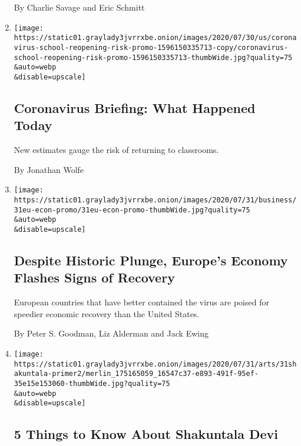\begin{enumerate}
  By Charlie Savage and Eric Schmitt
\item
  \href{/2020/07/31/us/coronavirus-today.html}{}

  \texttt{[image: https://static01.graylady3jvrrxbe.onion/images/2020/07/30/us/coronavirus-school-reopening-risk-promo-1596150335713-copy/coronavirus-school-reopening-risk-promo-1596150335713-thumbWide.jpg?quality=75\\\&auto=webp\\\&disable=upscale]}

  \hypertarget{coronavirus-briefing-what-happened-today}{%
  \subsection{Coronavirus Briefing: What Happened
  Today}\label{coronavirus-briefing-what-happened-today}}

  New estimates gauge the risk of returning to classrooms.

  By Jonathan Wolfe
\item
  \href{/2020/07/31/business/europe-economy-recovery-coronavirus.html}{}

  \texttt{[image: https://static01.graylady3jvrrxbe.onion/images/2020/07/31/business/31eu-econ-promo/31eu-econ-promo-thumbWide.jpg?quality=75\\\&auto=webp\\\&disable=upscale]}

  \hypertarget{despite-historic-plunge-europes-economy-flashes-signs-of-recovery}{%
  \subsection{Despite Historic Plunge, Europe's Economy Flashes Signs of
  Recovery}\label{despite-historic-plunge-europes-economy-flashes-signs-of-recovery}}

  European countries that have better contained the virus are poised for
  speedier economic recovery than the United States.

  By Peter S. Goodman, Liz Alderman and Jack Ewing
\item
  \href{/2020/07/31/movies/shakuntala-devi-movie.html}{}

  \texttt{[image: https://static01.graylady3jvrrxbe.onion/images/2020/07/31/arts/31shakuntala-primer2/merlin\_175165059\_16547c37-e893-491f-95ef-35e15e153060-thumbWide.jpg?quality=75\\\&auto=webp\\\&disable=upscale]}

  \hypertarget{5-things-to-know-about-shakuntala-devi}{%
  \subsection{5 Things to Know About Shakuntala
  Devi}\label{5-things-to-know-about-shakuntala-devi}}


\end{enumerate}
